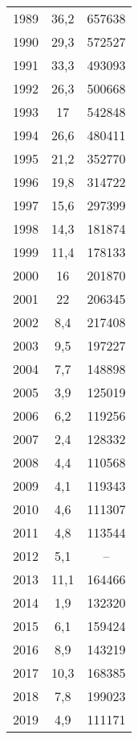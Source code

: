 \documentclass[french,11pt]{book}
\begin{document}
\begin{longtable}[t]{ccc}
1989 & 36,2 & 657638\\
1990 & 29,3 & 572527\\
1991 & 33,3 & 493093\\
1992 & 26,3 & 500668\\
1993 & 17 & 542848\\
1994 & 26,6 & 480411\\
1995 & 21,2 & 352770\\
1996 & 19,8 & 314722\\
1997 & 15,6 & 297399\\
1998 & 14,3 & 181874\\
1999 & 11,4 & 178133\\
2000 & 16 & 201870\\
2001 & 22 & 206345\\
2002 & 8,4 & 217408\\
2003 & 9,5 & 197227\\
2004 & 7,7 & 148898\\
2005 & 3,9 & 125019\\
2006 & 6,2 & 119256\\
2007 & 2,4 & 128332\\
2008 & 4,4 & 110568\\
2009 & 4,1 & 119343\\
2010 & 4,6 & 111307\\
2011 & 4,8 & 113544\\
2012 & 5,1 & --\\
2013 & 11,1 & 164466\\
2014 & 1,9 & 132320\\
2015 & 6,1 & 159424\\
2016 & 8,9 & 143219\\
2017 & 10,3 & 168385\\
2018 & 7,8 & 199023\\
2019 & 4,9 & 111171\\*
\end{longtable}
\clearpage
\end{document}
